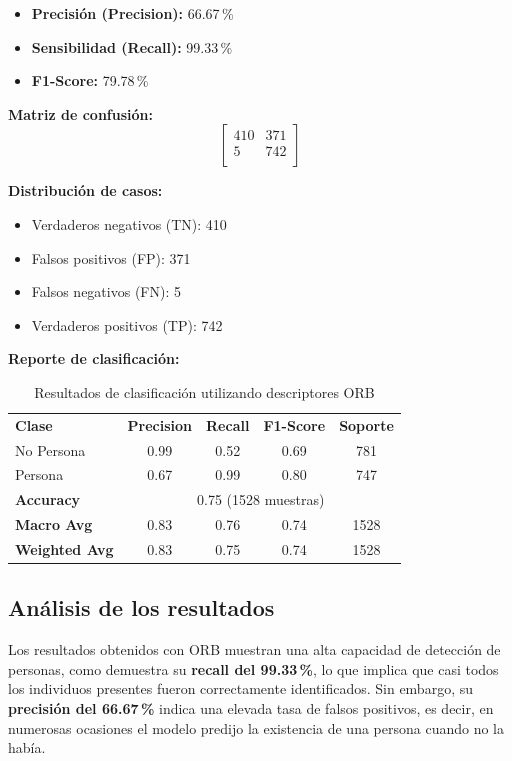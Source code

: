 \documentclass[a4paper]{article}
\begin{document}
\begin{itemize}
    \item \textbf{Precisión (Precision):} 66.67\,\%
    \item \textbf{Sensibilidad (Recall):} 99.33\,\%
    \item \textbf{F1-Score:} 79.78\,\%
\end{itemize}

\begin{center}
\textbf{Matriz de confusión:}
\[
\begin{bmatrix}
410 & 371 \\
5 & 742 \\
\end{bmatrix}
\]
\end{center}

\textbf{Distribución de casos:}
\begin{itemize}
    \item Verdaderos negativos (TN): 410
    \item Falsos positivos (FP): 371
    \item Falsos negativos (FN): 5
    \item Verdaderos positivos (TP): 742
\end{itemize}

\textbf{Reporte de clasificación:}

\begin{table}[H]
\centering
\begin{tabular}{lcccc}
\textbf{Clase} & \textbf{Precision} & \textbf{Recall} & \textbf{F1-Score} & \textbf{Soporte} \\
No Persona & 0.99 & 0.52 & 0.69 & 781 \\
Persona    & 0.67 & 0.99 & 0.80 & 747 \\
\textbf{Accuracy} & \multicolumn{4}{c}{0.75 (1528 muestras)} \\
\textbf{Macro Avg} & 0.83 & 0.76 & 0.74 & 1528 \\
\textbf{Weighted Avg} & 0.83 & 0.75 & 0.74 & 1528 \\
\end{tabular}
\caption{Resultados de clasificación utilizando descriptores ORB}
\end{table}

\subsection*{Análisis de los resultados}

Los resultados obtenidos con ORB muestran una alta capacidad de detección de personas, como demuestra su \textbf{recall del 99.33\,\%}, lo que implica que casi todos los individuos presentes fueron correctamente identificados. Sin embargo, su \textbf{precisión del 66.67\,\%} indica una elevada tasa de falsos positivos, es decir, en numerosas ocasiones el modelo predijo la existencia de una persona cuando no la había.
\end{document}
